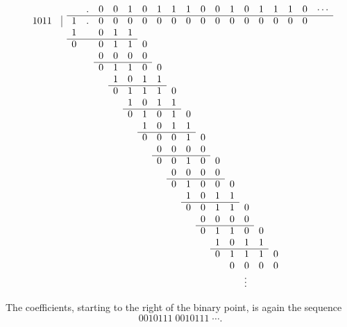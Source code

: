 {\begin{example}
\begin{fsL}
\[
\begin{array}{rrllllllllllllllllllllllllllllllllllll}
           &   &   &.&0&0&1&0&1&1&1 &0&0&1&0&1&1&1 &0&\cdots \\
   \cline{3-20}
   1011    &\vline   & 1 &.&0&0&0&0&0&0&0 &0&0&0&0&0&0&0 &0 \\
           &   & 1 & &0&1&1 \\
   \cline{3-7}
           &   & 0 & &0&1&1&0 \\
           &   &   & &0&0&0&0 \\
   \cline{5-8}
           &   &   & &0&1&1&0&0 \\
           &   &   & & &1&0&1&1 \\
   \cline{6-9}
           &   &   & & &0&1&1&1&0 \\
           &   &   & & & &1&0&1&1 \\
   \cline{7-10}
           &   &   & & & &0&1&0&1&0 \\
           &   &   & & & & &1&0&1&1 \\
   \cline{8-11}
           &   &   & & & & &0&0&0&1&0 \\
           &   &   & & & & & &0&0&0&0 \\
   \cline{9-12}
           &   &   & & & & & &0&0&1&0&0 \\
           &   &   & & & & & & &0&0&0&0 \\
   \cline{10-13}
           &   &   & & & & & & &0&1&0&0&0 \\
           &   &   & & & & & & & &1&0&1&1 \\
   \cline{11-14}
           &   &   & & & & & & & &0&0&1&1&0 \\
           &   &   & & & & & & & & &0&0&0&0 \\
   \cline{12-15}
           &   &   & & & & & & & & &0&1&1&0&0 \\
           &   &   & & & & & & & & & &1&0&1&1 \\
   \cline{13-16}
           &   &   & & & & & & & & & &0&1&1&1&0 \\
           &   &   & & & & & & & & & & &0&0&0&0 \\
           &   &   & & & & & & & & & & & &\vdots& &  \\
\end{array}
\]
\end{fsL}

The coefficients, starting to the right of the binary point,
is again the sequence
\[ 0010111 \; 0010111 \; \cdots. \]
\end{example}

} %


